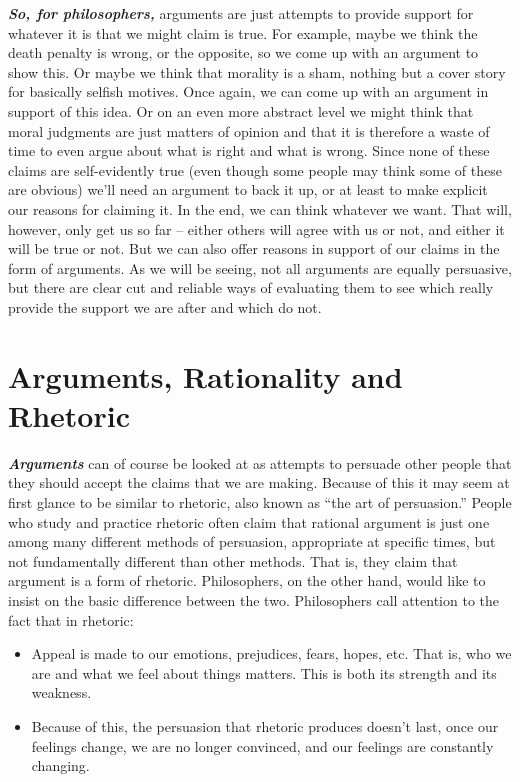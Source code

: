 \documentclass[12pt, openany]{book}
\begin{document}
\textbf{\emph{So, for philosophers,}} arguments are just attempts to provide support for whatever it is that we might claim is true. For example, maybe we think the death penalty is wrong, or the opposite, so we come up with an argument to show this. Or maybe we think that morality is a sham, nothing but a cover story for basically selfish motives. Once again, we can come up with an argument in support of this idea. Or on an even more abstract level we might think that moral judgments are just matters of opinion and that it is therefore a waste of time to even argue about what is right and what is wrong. Since none of these claims are self-evidently true (even though some people may think some of these are obvious) we'll need an argument to back it up, or at least to make explicit our reasons for claiming it. In the end, we can think whatever we want. That will, however, only get us so far -- either others will agree with us or not, and either it will be true or not. But we can also offer reasons in support of our claims in the form of arguments. As we will be seeing, not all arguments are equally persuasive, but there are clear cut and reliable ways of evaluating them to see which really provide the support we are after and which do not.

\hypertarget{arguments-rationality-and-rhetoric}{%
\section{Arguments, Rationality and Rhetoric}\label{arguments-rationality-and-rhetoric}}

\textbf{\emph{Arguments}} can of course be looked at as attempts to persuade other people that they should accept the claims that we are making. Because of this it may seem at first glance to be similar to rhetoric, also known as ``the art of persuasion.'' People who study and practice rhetoric often claim that rational argument is just one among many different methods of persuasion, appropriate at specific times, but not fundamentally different than other methods. That is, they claim that argument is a form of rhetoric. Philosophers, on the other hand, would like to insist on the basic difference between the two. Philosophers call attention to the fact that in rhetoric:

\begin{itemize}
\item
  Appeal is made to our emotions, prejudices, fears, hopes, etc. That is, who we are and what we feel about things matters. This is both its strength and its weakness.
\item
  Because of this, the persuasion that rhetoric produces doesn't last, once our feelings change, we are no longer convinced, and our feelings are constantly changing.
\end{itemize}
\end{document}
